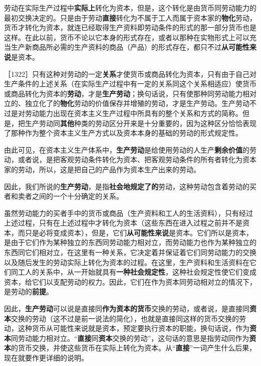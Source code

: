 劳动在实际生产过程中\textbf{实际上}转化为资本，但是，这个转化是由货币同劳动能力的最初交换决定的。只是由于劳动\textbf{直接}转化为不属于工人而属于资本家的\textbf{物化}劳动，货币才转化为资本，就连已经取得生产资料即劳动条件的形式的那一部分货币也是这样。在此以前，货币不论以它本身的形式存在，或者以那种在实物形式上可以充当生产新商品所必需的生产资料的商品（产品）的形式存在，都只不过\textbf{从可能性来说}是资本。

［1322］只有这种对劳动的一定\textbf{关系}才使货币或商品转化为资本，只有由于自己对生产条件的上述关系（在实际生产过程中有一定的关系同这个关系相适应）使货币或商品转化为资本的\textbf{劳动}，才是\textbf{生产劳动}；换句话说，只有使那种同劳动能力相对立的、独立化了的\textbf{物化}劳动的价值保存并增殖的劳动，才是生产劳动。生产劳动不过是对劳动能力出现在资本主义生产过程中所具有的整个关系和方式的简称。但是，把生产劳动同\textbf{其他}种类的劳动区分开来是十分重要的，因为这种区分恰恰表现了那种作为整个资本主义生产方式以及资本本身的基础的劳动的形式规定性。

由此可见，在资本主义生产体系中，\textbf{生产劳动}是给使用劳动的人生产\textbf{剩余价值}的劳动，或者说，是把客观劳动条件转化为资本、把客观劳动条件的所有者转化为资本家的劳动，所以，这是把自己的产品作为资本生产出来的劳动。

因此，我们所说的\textbf{生产劳动}，是指\textbf{社会地规定了的}劳动，这种劳动包含着劳动的买者和卖者之间的一个十分确定的关系。

虽然劳动能力的买者手中的货币或商品（生产资料和工人的生活资料），只有经过上述过程，只有在上述过程中才转化为资本（这些东西在进入过程之前并不是资本，而只是必将变成资本），但是，它们\textbf{从可能性来说}是资本。它们所以是资本，是由于它们作为某种独立的东西同劳动能力相对立，而劳动能力也作为某种独立的东西同它们相对立，在这里有一种关系，它决定着并保证着它们同劳动能力的交换以及随后发生的劳动实际上转化为资本的过程。在这里，生产资料和生活资料在它们同工人的关系中，从一开始就具有\textbf{一种社会规定性}，这种社会规定性使它们变成资本，给它们以支配劳动的权力。因此，它们在作为资本同劳动相对立的情况下，是劳动的\textbf{前提}。

因此，\textbf{生产劳动}可以说是直接同\textbf{作为资本的货币}交换的劳动，或者说，是直接同\textbf{资本}交换的劳动（这不过是前一说法的简化），也就是直接同这样的货币交换的劳动，这种货币从可能性来说就是资本，预定要执行资本的职能，换句话说，作为\textbf{资本}同劳动能力相对立。“\textbf{直接}同\textbf{资本}交换的劳动”，这句话的意思是指劳动同作为\textbf{资本}的货币交换，并使这些货币在实际上转化为资本。从“\textbf{直接}”一词产生什么后果，现在就要作更详细的说明。

